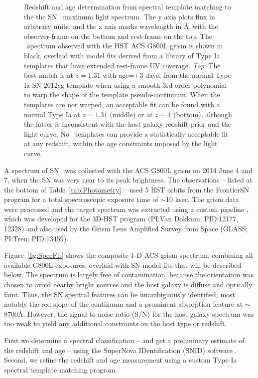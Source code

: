 \begin{figure}
\begin{center}
{Redshift and age determination from spectral template matching to the
the SN \tomas\ maximum light spectrum.  The y axis plots flux in
arbitrary units, and the x axis marks wavelength in \AA\ with the
observer-frame on the bottom and rest-frame on the top.
The \tomas\ spectrum observed with the
HST ACS G800L grism is shown in black, overlaid with model fits
derived from a library of Type Ia templates that have extended
rest-frame UV coverage.  {\it Top}: The best match is at $z=1.31$ with
age=$+3$ days, from the normal Type Ia SN 2012cg template when using a
smooth 3rd-order polynomial to warp the shape of the template
pseudo-continuum.  When the templates are not warped, an acceptable
fit can be found with a normal Type Ia at $z=1.31$ (middle) or at
$z\sim1$ (bottom), although the latter is inconsistent with the host
galaxy redshift prior and the light curve. No \CCSN\ templates can
provide a statistically acceptable fit at any redshift, within the age
constraints imposed by the light curve.}
\end{center}
\end{figure}


A spectrum of SN \tomas\ was collected with the ACS G800L grism on
2014 June 4 and 7, when the SN was very near to its peak brightness.
The observations -- listed at the bottom of Table~\ref{tab:Photometry}
-- used 5 HST orbits from the FrontierSN program for a total
spectroscopic exposure time of $\sim$10 ksec.  The grism data were
processed and the target spectrum was extracted using a custom
pipeline \citep{Brammer:2012}, which was developed for the 3D-HST
program (PI:Van Dokkum; PID:12177, 12328) and also used by the Grism
Lens Amplified Survey from Space (GLASS; PI:Treu; PID:13459).

Figure~\ref{fig:SpecFit} shows the composite 1-D ACS grism spectrum,
combining all available G800L exposures, overlaid with SN model fits
that will be described below.  The spectrum is largely free of
contamination, because the orientation was chosen to avoid nearby
bright sources and the host galaxy is diffuse and optically faint.
Thus, the SN spectral features can be unambiguously identified, most
notably the red slope of the continuum and a prominent absorption
feature at $\sim$8700\AA.  However, the signal to noise ratio (S/N)
for the host galaxy spectrum was too weak to yield any additional
constraints on the host type or redshift.

  First we determine a spectral
classification -- and get a preliminary estimate of the redshift and
age -- using the SuperNova IDentification (SNID)
software \citep{Blondin:2007}.  Second, we refine the redshift and age
measurement using a custom Type Ia spectral template matching program.

